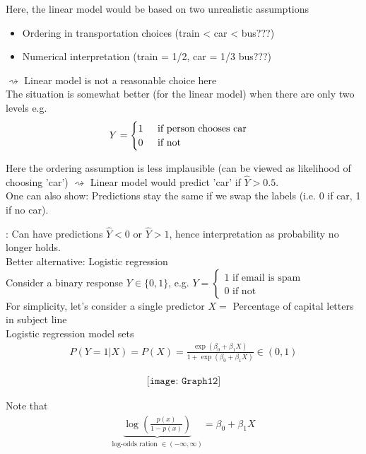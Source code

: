\documentclass[11pt,a4paper,numbers=endperiod]{scrartcl}
\newcommand{\id}{\hspace*{4mm}}
\newcommand{\tit}[1]{\begin{large} \underline{\text{#1}}\end{large}}
\begin{document}
{\id Here, the linear model would be based on two unrealistic assumptions \begin{itemize}
	\item Ordering in transportation choices (train < car < bus???) 
	\item Numerical interpretation  (train = 1/2, car = 1/3 bus???)
\end{itemize}
\id $\rightsquigarrow$ Linear model is not a reasonable choice here\\

The situation is somewhat better (for the linear model) when there are only two levels e.g. \begin{align*}
	Y = \begin{cases}
		1 \id \text{ if person chooses car}\\
		0 \id \text{ if not} 
	\end{cases}
\end{align*}

Here the ordering assumption is less implausible (can be viewed as likelihood of choosing 'car') $\rightsquigarrow$ Linear model would predict 'car' if $\hat{Y} > 0.5$.\\
One can also show: Predictions stay the same if we swap the labels (i.e. 0 if car, 1 if no car).\\ 

\tit{Con}: Can have predictions $\hat{Y} < 0$ or $\hat{Y} > 1$, hence interpretation as probability no longer holds.\\
\id \id {} Better alternative: Logistic regression\\
Consider a binary response $Y \in \{0,1\}$, e.g. $Y = \begin{cases}
1 \text{ if email is spam}\\
0 \text{ if not}
\end{cases}$\\
For simplicity, let's consider a single predictor $X =$ Percentage of capital letters in subject line\\
Logistic regression model sets \begin{align*}
	P(Y = 1| X) = P(X) = \frac{\exp(\beta_0 + \beta_1 X)}{1 + \exp(\beta_0 + \beta_1 X)} \in (0,1) 
\end{align*}

\begin{align*}
	\texttt{[image: Graph12]}
\end{align*}

Note that \begin{align*}
	\underbrace{\log\left(\frac{p(x)}{1 - p(x)}\right)}_{\text{log-odds ration } \in (- \infty, \infty)} = \beta_0 + \beta_1 X
\end{align*}

}
\end{document}

